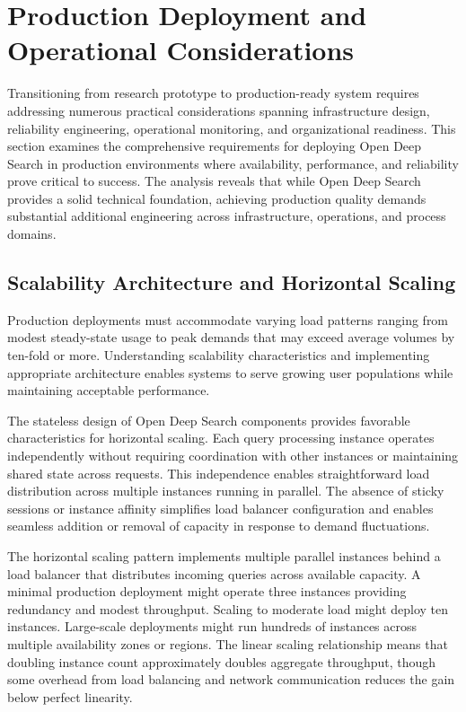 \section{Production Deployment and Operational Considerations}

Transitioning from research prototype to production-ready system requires addressing numerous practical considerations spanning infrastructure design, reliability engineering, operational monitoring, and organizational readiness. This section examines the comprehensive requirements for deploying Open Deep Search in production environments where availability, performance, and reliability prove critical to success. The analysis reveals that while Open Deep Search provides a solid technical foundation, achieving production quality demands substantial additional engineering across infrastructure, operations, and process domains.

\subsection{Scalability Architecture and Horizontal Scaling}

Production deployments must accommodate varying load patterns ranging from modest steady-state usage to peak demands that may exceed average volumes by ten-fold or more. Understanding scalability characteristics and implementing appropriate architecture enables systems to serve growing user populations while maintaining acceptable performance.

The stateless design of Open Deep Search components provides favorable characteristics for horizontal scaling. Each query processing instance operates independently without requiring coordination with other instances or maintaining shared state across requests. This independence enables straightforward load distribution across multiple instances running in parallel. The absence of sticky sessions or instance affinity simplifies load balancer configuration and enables seamless addition or removal of capacity in response to demand fluctuations.

The horizontal scaling pattern implements multiple parallel instances behind a load balancer that distributes incoming queries across available capacity. A minimal production deployment might operate three instances providing redundancy and modest throughput. Scaling to moderate load might deploy ten instances. Large-scale deployments might run hundreds of instances across multiple availability zones or regions. The linear scaling relationship means that doubling instance count approximately doubles aggregate throughput, though some overhead from load balancing and network communication reduces the gain below perfect linearity.

